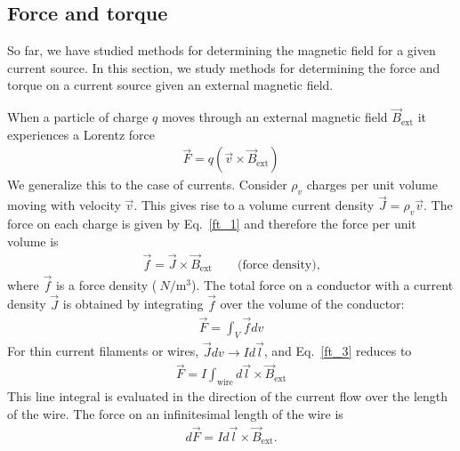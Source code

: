 \documentclass[11pt,a4paper,oneside]{book}
\numberwithin{equation}{section}
\theoremstyle{it}
\theoremstyle{definition}
\begin{document}
\subsection{Force and torque}
So far, we have studied methods for determining the magnetic field for a given current source. In this section, we study methods for determining the force and torque on a current source given an external magnetic field.

When a particle of charge $q$ moves through an external magnetic field $\vec{B}_{\text{ext}}$ it experiences a Lorentz force
\begin{equation}\label{ft_1}
	\begin{aligned}
		\vec{F}=q(\vec{v}\times\vec{B}_{\text{ext}})
	\end{aligned}
\end{equation}
 We generalize this to the case of currents. Consider $\rho_v$ charges per unit volume moving with velocity $\vec{v}$. This gives rise to a volume current density $\vec{J}=\rho_v\vec{v}$. The force on each charge is given by Eq.~\eqref{ft_1} and therefore the force per unit volume is
 \begin{equation}\label{ft_2}
 	\begin{aligned}
 		\vec{f}=\vec{J}\times\vec{B}_{\text{ext}}\qquad\text{(force density),}
 	\end{aligned}
 \end{equation}
where $\vec{f}$ is a force density ($\SI{}{N\per\cubic\meter}$). The total force on a conductor with a current density $\vec{J}$ is obtained by integrating $\vec{f}$ over the volume of the conductor: 
\begin{equation}\label{ft_3}
	\begin{aligned}
		\vec{F}=\int_{V}\vec{f}dv
	\end{aligned}
\end{equation}
For thin current filaments or wires, $\vec{J}dv\rightarrow Id\vec{l}$, and Eq.~\eqref{ft_3} reduces to 
\begin{equation}\label{ft_4}
\boxed{	\begin{aligned}
		\vec{F}=I\int_{\text{wire}}d\vec{l}\times\vec{B}_{\text{ext}}
	\end{aligned}}
\end{equation}
This line integral is evaluated in the direction of the current flow over the length of the wire. The force on an infinitesimal length of the wire is
 \begin{equation}\label{ft_5}
 	\begin{aligned}
 		d\vec{F} = Id\vec{l}\times\vec{B}_{\text{ext}}.
 	\end{aligned}
 \end{equation}
\end{document}
